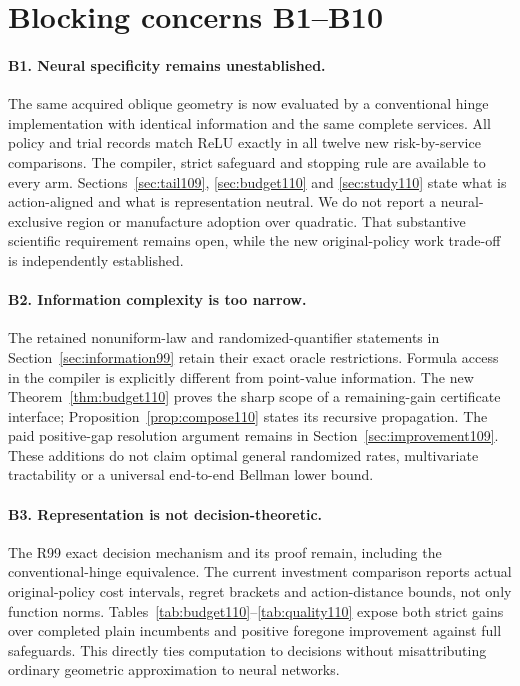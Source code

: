 \documentclass[11pt]{article}
\begin{document}
\section*{Blocking concerns B1--B10}
\paragraph{B1. Neural specificity remains unestablished.}
The same acquired oblique geometry is now evaluated by a conventional hinge implementation with identical information and the same complete services. All policy and trial records match ReLU exactly in all twelve new risk-by-service comparisons. The compiler, strict safeguard and stopping rule are available to every arm. Sections~\ref{sec:tail109}, \ref{sec:budget110} and \ref{sec:study110} state what is action-aligned and what is representation neutral. We do not report a neural-exclusive region or manufacture adoption over quadratic. That substantive scientific requirement remains open, while the new original-policy work trade-off is independently established.

\paragraph{B2. Information complexity is too narrow.}
The retained nonuniform-law and randomized-quantifier statements in Section~\ref{sec:information99} retain their exact oracle restrictions. Formula access in the compiler is explicitly different from point-value information. The new Theorem~\ref{thm:budget110} proves the sharp scope of a remaining-gain certificate interface; Proposition~\ref{prop:compose110} states its recursive propagation. The paid positive-gap resolution argument remains in Section~\ref{sec:improvement109}. These additions do not claim optimal general randomized rates, multivariate tractability or a universal end-to-end Bellman lower bound.

\paragraph{B3. Representation is not decision-theoretic.}
The R99 exact decision mechanism and its proof remain, including the conventional-hinge equivalence. The current investment comparison reports actual original-policy cost intervals, regret brackets and action-distance bounds, not only function norms. Tables~\ref{tab:budget110}--\ref{tab:quality110} expose both strict gains over completed plain incumbents and positive foregone improvement against full safeguards. This directly ties computation to decisions without misattributing ordinary geometric approximation to neural networks.
\end{document}
